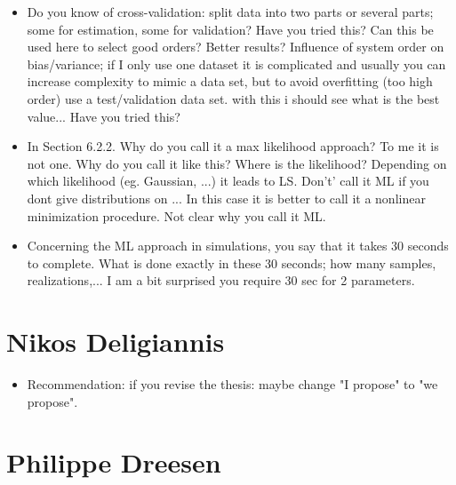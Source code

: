 \documentclass[11pt]{article}
\begin{document}
\begin{itemize}
	\item   Do you know of cross-validation: split data into two parts or several parts; some for estimation, some for validation? Have you tried this? Can this be used here to select good orders? Better results? Influence of system order on bias/variance; if I only use one dataset it is complicated and usually you can increase complexity to mimic a data set, but to avoid overfitting (too high order) use a test/validation data set. with this i should see what is the best value... Have you tried this?
	
	\item   In Section 6.2.2. Why do you call it a max likelihood approach? To me it is not one. Why do you call it like this? Where is the likelihood? Depending on which likelihood (eg. Gaussian, ...) it leads to LS. Don't' call it ML if you dont give distributions on ... In this case it is better to call it a nonlinear minimization procedure. Not clear why you call it ML.
	
	\item   Concerning the ML approach in simulations, you say that it takes 30 seconds to complete. What is done exactly in these 30 seconds; how many samples, realizations,... I am a bit surprised you require 30 sec for 2 parameters.
	
\end{itemize}

\section*{Nikos Deligiannis}

\begin{itemize}

	\item  Recommendation: if you revise the thesis: maybe change "I propose" to "we propose".
	
	
\end{itemize}

\section*{Philippe Dreesen}
\end{document}

